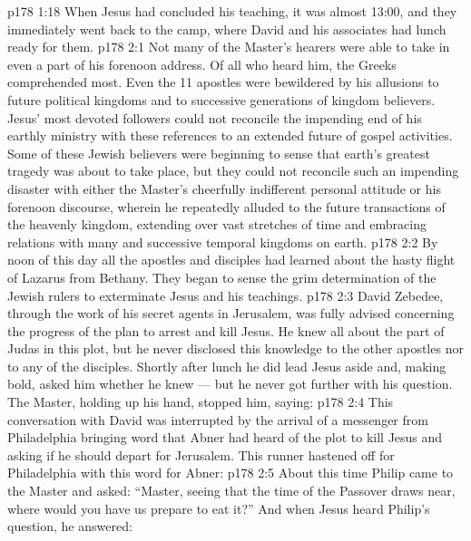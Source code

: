 \vs p178 1:18 \pc When Jesus had concluded his teaching, it was almost 13:00, and they immediately went back to the camp, where David and his associates had lunch ready for them.
\vs p178 2:1 Not many of the Master’s hearers were able to take in even a part of his forenoon address. Of all who heard him, the Greeks comprehended most. Even the 11 apostles were bewildered by his allusions to future political kingdoms and to successive generations of kingdom believers. Jesus’ most devoted followers could not reconcile the impending end of his earthly ministry with these references to an extended future of gospel activities. Some of these Jewish believers were beginning to sense that earth’s greatest tragedy was about to take place, but they could not reconcile such an impending disaster with either the Master’s cheerfully indifferent personal attitude or his forenoon discourse, wherein he repeatedly alluded to the future transactions of the heavenly kingdom, extending over vast stretches of time and embracing relations with many and successive temporal kingdoms on earth.
\vs p178 2:2 By noon of this day all the apostles and disciples had learned about the hasty flight of Lazarus from Bethany. They began to sense the grim determination of the Jewish rulers to exterminate Jesus and his teachings.
\vs p178 2:3 David Zebedee, through the work of his secret agents in Jerusalem, was fully advised concerning the progress of the plan to arrest and kill Jesus. He knew all about the part of Judas in this plot, but he never disclosed this knowledge to the other apostles nor to any of the disciples. Shortly after lunch he did lead Jesus aside and, making bold, asked him whether he knew --- but he never got further with his question. The Master, holding up his hand, stopped him, saying: 
\vs p178 2:4 This conversation with David was interrupted by the arrival of a messenger from Philadelphia bringing word that Abner had heard of the plot to kill Jesus and asking if he should depart for Jerusalem. This runner hastened off for Philadelphia with this word for Abner: 
\vs p178 2:5 About this time Philip came to the Master and asked: “Master, seeing that the time of the Passover draws near, where would you have us prepare to eat it?” And when Jesus heard Philip’s question, he answered: 
